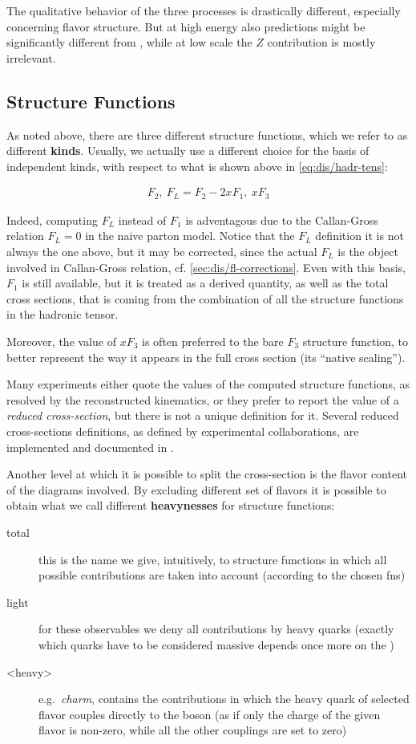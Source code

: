 The qualitative behavior of the three processes is drastically different,
especially \cc concerning flavor structure.
But at high energy also \nc predictions might be significantly different from
\ec, while at low scale the $Z$ contribution is mostly irrelevant.

\subsection{Structure Functions}

As noted above, there are three different structure functions, which we refer
to as different \textbf{kinds}.
Usually, we actually use a different choice for the basis of independent kinds,
with respect to what is shown above in \cref{eq:dis/hadr-tens}:

\begin{align}
    F_2,~ F_L = F_2 - 2xF_1,~ xF_3
\end{align}

Indeed, computing $F_L$ instead of $F_1$ is adventagous due to the Callan-Gross
relation \cite{Callan:1969uq} $F_L=0$ in the naive parton model.
Notice that the $F_L$ definition it is not always the one above, but it may be
corrected, since the actual $F_L$ is the object involved in Callan-Gross
relation, cf. \cref{sec:dis/fl-corrections}.
%
Even with this basis, $F_1$ is still available, but it is treated as a derived
quantity, as well as the total cross sections, that is coming from the
combination of all the structure functions in the hadronic tensor.

Moreover, the value of $xF_3$ is often preferred to the bare $F_3$ structure
function, to better represent the way it appears in the full cross section (its
\enquote{native scaling}).

Many experiments either quote the values of the computed structure functions,
as resolved by the reconstructed kinematics, or they prefer to report the value
of a \textit{reduced cross-section}, but there is not a unique definition for
it.
Several reduced cross-sections definitions, as defined by experimental
collaborations, are implemented and documented in \yadism.

Another level at which it is possible to split the \dis cross-section is the
flavor content of the diagrams involved.
By excluding different set of flavors it is possible to obtain what we call
different \textbf{heavynesses} for structure functions:
\begin{description}
  \item[total] this is the name we give, intuitively, to structure functions in
    which all possible contributions are taken into account (according to the
    chosen \acrlong{fns})
  \item[light] for these observables we deny all contributions by heavy quarks
    (exactly which quarks have to be considered massive depends once more on
    the \fns)
  \item[<heavy>] e.g.\ \textit{charm}, contains the contributions in which the
    heavy quark of selected flavor couples directly to the \ew boson (as if
    only the charge of the given flavor is non-zero, while all the other
    couplings are set to zero)
\end{description}

